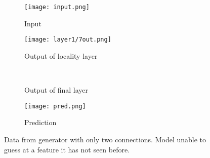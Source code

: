\begin{figure}[h]
   \centering
   \graphicspath{{resources/models/3neurEx/fullRun/2conn1/}}
   \begin{subfigure}{.16\textwidth}
   	\centering
   	\texttt{[image: input.png]}
   	\caption{Input}
   \end{subfigure}
   \begin{minipage}{.5\textwidth}
   	\centering
   	\begin{subfigure}{.8\textwidth}
   		\centering
   		\texttt{[image: layer1/7out.png]}
   		\caption{Output of locality layer}
   	\end{subfigure}\\
   	\vfill
   	\begin{subfigure}{.8\textwidth}
   		\centering
   		\caption{Output of final layer}
   	\end{subfigure}
   \end{minipage}
   \begin{minipage}{.25\textwidth}
   	\centering
	\begin{subfigure}{\textwidth}
   		\centering
   		\texttt{[image: pred.png]}
   		\caption{Prediction}
   	\end{subfigure}
   \end{minipage}
   \caption{Data from generator with only two connections. Model unable to guess 
   at a feature it has not seen before.}
   \label{fig:2conn1}
\end{figure}
